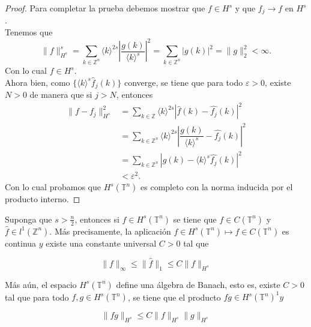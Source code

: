 \documentclass[12pt]{article}
\newcommand\Z{\ensuremath{\mathbb{Z}}}
\newcommand\T{\mathbb{T}}
\renewcommand{\epsilon}{\varepsilon}
\renewcommand{\hat}{\widehat}
\begin{document}
\begin{proof}
Para completar la prueba debemos mostrar que $f\in H^{s}$ y que $f_{j}\rightarrow f$ en $H^{s}$.\\
Tenemos que
$$\|f\|^{s}_{H^{s}}=\displaystyle\sum_{k\in \Z ^{n}} \langle k \rangle^{2s}\left| \dfrac{g(k)}{\langle k\rangle^{s}}\right|^{2}=\displaystyle\sum_{k\in \Z^{n}}|g(k)|^{2}=\|g\|^{2}_{2}<\infty.$$
Con lo cual $f\in H^{s}$.\\
Ahora bien, como $\{\langle k \rangle^{s}\widehat{f}_j(k)\}$ converge, se tiene que para todo $\epsilon>0$, existe $N>0$ de manera que si $j>N$, entonces 
\begin{align*}
   \|f-f_j\|_{H^{s}}^{2}&=\sum_{k\in \Z}\langle k \rangle^{2s}|\hat{f}(k)-\hat{f_j}(k)|^{2}\\
   &=\sum_{k\in \Z^{n}} \langle k\rangle^{2s}\left| \dfrac{g(k)}{\langle k \rangle^{s}}-  \hat{f_j}(k) \right|^{2} \\
   &= \sum_{k\in \Z^{n}} \left| g(k)- \langle k\rangle^{s} \hat{f_j}(k) \right|^{2} \\
   &< \epsilon^{2}
.\end{align*}
Con lo cual probamos que $H^{s}(\T^{n})$ es completo con la norma inducida por el producto interno.

\end{proof}

\begin{theorem}\label{algebra}
Suponga que $s>\frac{n}{2}$, entonces si $f \in H^s\left(\mathbb{T}^n\right)$ se tiene que $f\in C\left(\mathbb{T}^n\right)$ y $\widehat{f} \in l^1\left(\mathbb{Z}^n\right)$. Más precisamente, la aplicación $f \in H^s\left(\mathbb{T}^n\right) \mapsto f \in C\left(\mathbb{T}^n\right)$ es continua $y$ existe una constante universal $C>0$ tal que

$$
\|f\|_{\infty} \leq\|\widehat{f}\|_1 \leq C\|f\|_{H^s}
$$


Más aún, el espacio $H^s\left(\mathbb{T}^n\right)$ define una álgebra de Banach, esto es, existe $C>0$ tal que para todo $f, g \in H^s\left(\mathbb{T}^n\right)$, se tiene que el producto $f g \in H^s\left(\mathbb{T}^n\right)^1 y$

$$
\|f g\|_{H^s} \leq C\|f\|_{H^s}\|g\|_{H^s}
$$
\end{theorem}
\end{document}
